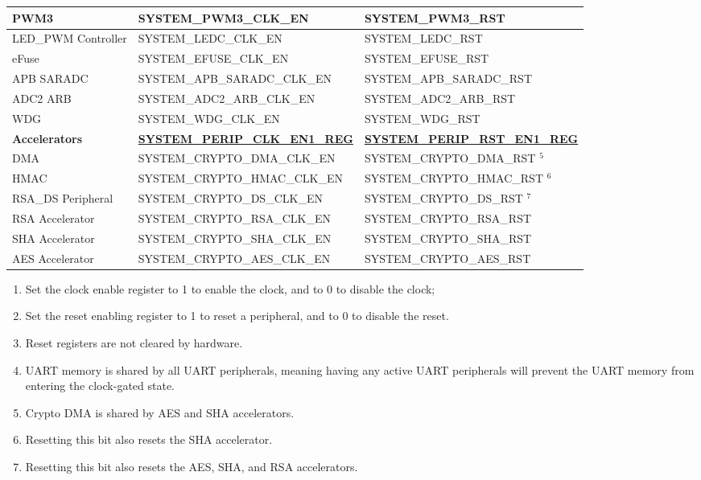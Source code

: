 \documentclass[main\_\_EN.tex]{subfiles}
\begin{document}
\begin{longtable}[c]{ |p{4cm}|p{6cm}|p{6cm}| }
PWM3    & SYSTEM\_PWM3\_CLK\_EN & SYSTEM\_PWM3\_RST \\\hline
LED\_PWM Controller    & SYSTEM\_LEDC\_CLK\_EN & SYSTEM\_LEDC\_RST \\\hline
eFuse    & SYSTEM\_EFUSE\_CLK\_EN & SYSTEM\_EFUSE\_RST \\\hline
APB SARADC    & SYSTEM\_APB\_SARADC\_CLK\_EN & SYSTEM\_APB\_SARADC\_RST \\\hline
ADC2 ARB    & SYSTEM\_ADC2\_ARB\_CLK\_EN & SYSTEM\_ADC2\_ARB\_RST \\\hline
WDG    & SYSTEM\_WDG\_CLK\_EN & SYSTEM\_WDG\_RST \\\hline
\textbf{Accelerators} & \textbf{\hyperref[regdesc:SYSTEMPERIPCLKEN1REG]{SYSTEM\_PERIP\_CLK\_EN1\_REG}} & \textbf{\hyperref[regdesc:SYSTEMPERIPRSTEN1REG]{SYSTEM\_PERIP\_RST\_EN1\_REG}} \\ \hline
DMA & SYSTEM\_CRYPTO\_DMA\_CLK\_EN & SYSTEM\_CRYPTO\_DMA\_RST {\hyperref[table:reset_notes]{$^5$}}  \\\hline
HMAC & SYSTEM\_CRYPTO\_HMAC\_CLK\_EN & SYSTEM\_CRYPTO\_HMAC\_RST {\hyperref[table:reset_notes]{$^6$}} \\\hline
RSA\_DS Peripheral & SYSTEM\_CRYPTO\_DS\_CLK\_EN & SYSTEM\_CRYPTO\_DS\_RST {\hyperref[table:reset_notes]{$^7$}} \\\hline
RSA Accelerator & SYSTEM\_CRYPTO\_RSA\_CLK\_EN & SYSTEM\_CRYPTO\_RSA\_RST \\\hline
SHA Accelerator & SYSTEM\_CRYPTO\_SHA\_CLK\_EN & SYSTEM\_CRYPTO\_SHA\_RST \\\hline
AES Accelerator & SYSTEM\_CRYPTO\_AES\_CLK\_EN & SYSTEM\_CRYPTO\_AES\_RST \\\hline
\end{longtable}


\begin{tiplisting}
\vspace{-3em}\label{table:reset_notes}
\begin{enumerate}
    \item Set the clock enable register to 1 to enable the clock, and to 0 to disable the clock;
    \item Set the reset enabling register to 1 to reset a peripheral, and to 0 to disable the reset.
    \item Reset registers are not cleared by hardware.
    \item UART memory is shared by all UART peripherals, meaning having any active UART peripherals will prevent the UART memory from entering the clock-gated state.
    \item Crypto DMA is shared by AES and SHA accelerators.
    \item Resetting this bit also resets the SHA accelerator.
    \item Resetting this bit also resets the AES, SHA, and RSA accelerators.
\end{enumerate}
\end{tiplisting}
\end{document}
